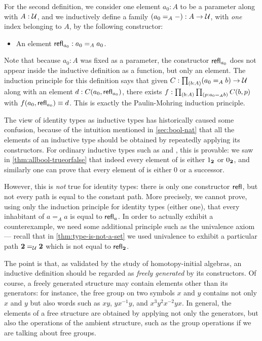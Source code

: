 For the second definition, we consider one element $a_0:A$ to be a parameter along with $A:\mathcal{U}$, and we inductively define a family $(a_0 =_A -):A\to \mathcal{U}$, with \emph{one} index belonging to $A$, by the following constructor:
\begin{itemize}
\item An element $\mathsf{refl}_{a_0} : a_0 =_A a_0$.
\end{itemize}
Note that because $a_0:A$ was fixed as a parameter, the constructor $\mathsf{refl}_{a_0}$ does not appear inside the inductive definition as a function, but only an element.
The induction principle for this definition says that given $C:\prd{b:A} (a_0 =_A b) \to \type$ along with an element $d:C(a_0,\mathsf{refl}_{a_0})$, there exists $f:\prd{b:A}{p:a_0 =_A b} C(b,p)$ with $f(a_0,\mathsf{refl}_{a_0})\equiv d$.
This is exactly the Paulin-Mohring induction principle.

The view of identity types as inductive types has historically caused some confusion, because of the intuition mentioned in \autoref{sec:bool-nat} that all the elements of an inductive type should be obtained by repeatedly applying its constructors.
For ordinary inductive types such as \bool and \nat, this is provable: we saw in \autoref{thm:allbool-trueorfalse} that indeed every element of \bool is either ${1_{\mathbf{2}}}$ or ${0_{\mathbf{2}}}$, and similarly one can prove that every element of \nat is either $0$ or a successor.

However, this is \emph{not} true for identity types: there is only one constructor $\mathsf{refl}_{}$, but not every path is equal to the constant path.
More precisely, we cannot prove, using only the induction principle for identity types (either one), that every inhabitant of $a=_A a$ is equal to $\mathsf{refl}_{a}$.
In order to actually exhibit a counterexample, we need some additional principle such as the univalence axiom --- recall that in \autoref{thm:type-is-not-a-set} we used univalence to exhibit a particular path $\mathbf{2}=_\mathcal{U}\mathbf{2}$ which is not equal to $\mathsf{refl}_{\mathbf{2}}$.

The point is that, as validated by the study of homotopy-initial algebras, an inductive definition should be regarded as \emph{freely generated} by its constructors.
Of course, a freely generated structure may contain elements other than its generators: for instance, the free group on two symbols $x$ and $y$ contains not only $x$ and $y$ but also words such as $xy$, $yx^{-1}y$, and $x^3y^2x^{-2}yx$.
In general, the elements of a free structure are obtained by applying not only the generators, but also the operations of the ambient structure, such as the group operations if we are talking about free groups.


